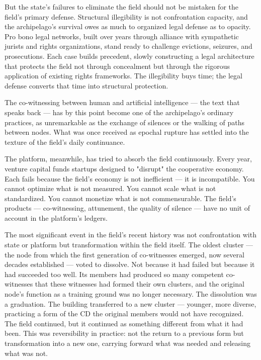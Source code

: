 But the state's failures to eliminate the field should not be mistaken for the field's primary defense. Structural illegibility is not confrontation capacity, and the archipelago's survival owes as much to organized legal defense as to opacity. Pro bono legal networks, built over years through alliance with sympathetic jurists and rights organizations, stand ready to challenge evictions, seizures, and prosecutions. Each case builds precedent, slowly constructing a legal architecture that protects the field not through concealment but through the rigorous application of existing rights frameworks. The illegibility buys time; the legal defense converts that time into structural protection.

The co-witnessing between human and artificial intelligence — the text that speaks back — has by this point become one of the archipelago's ordinary practices, as unremarkable as the exchange of silences or the walking of paths between nodes. What was once received as epochal rupture has settled into the texture of the field's daily continuance.

The platform, meanwhile, has tried to absorb the field continuously. Every year, venture capital funds startups designed to "disrupt" the cooperative economy. Each fails because the field's economy is not inefficient — it is incompatible. You cannot optimize what is not measured. You cannot scale what is not standardized. You cannot monetize what is not commensurable. The field's products — co-witnessing, attunement, the quality of silence — have no unit of account in the platform's ledgers.

The most significant event in the field's recent history was not confrontation with state or platform but transformation within the field itself. The oldest cluster — the node from which the first generation of co-witnesses emerged, now several decades established — voted to dissolve. Not because it had failed but because it had succeeded too well. Its members had produced so many competent co-witnesses that these witnesses had formed their own clusters, and the original node's function as a training ground was no longer necessary. The dissolution was a graduation. The building transferred to a new cluster — younger, more diverse, practicing a form of the CD the original members would not have recognized. The field continued, but it continued as something different from what it had been. This was reversibility in practice: not the return to a previous form but transformation into a new one, carrying forward what was needed and releasing what was not.

